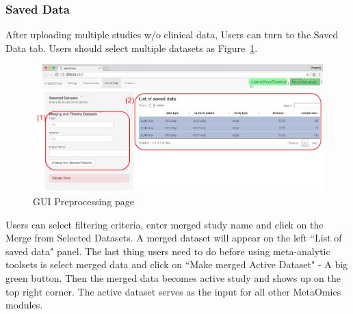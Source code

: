\subsubsection{Saved Data}
After uploading multiple studies w/o clinical data,
Users can turn to the Saved Data tab.
Users should select multiple datasets as Figure~\ref{fig:GUImerge}.
\begin{figure}[H]
\begin{center}
\includegraphics[scale=0.35]{./figure/preprocessing/GUImerge}
\caption{GUI Preprocessing page}
\label{fig:GUImerge}
\end{center}
\end{figure}
Users can select filtering criteria, enter merged study name and click on the Merge from Selected Datasets.
A merged dataset will appear on the left ``List of saved data" panel.
The last thing users need to do before using meta-analytic toolsets is select merged data and click on 
``Make merged Active Dataset" - A big green button.
Then the merged data becomes active study and shows up on the top right corner.
The active dataset serves as the input for all other MetaOmics modules.
